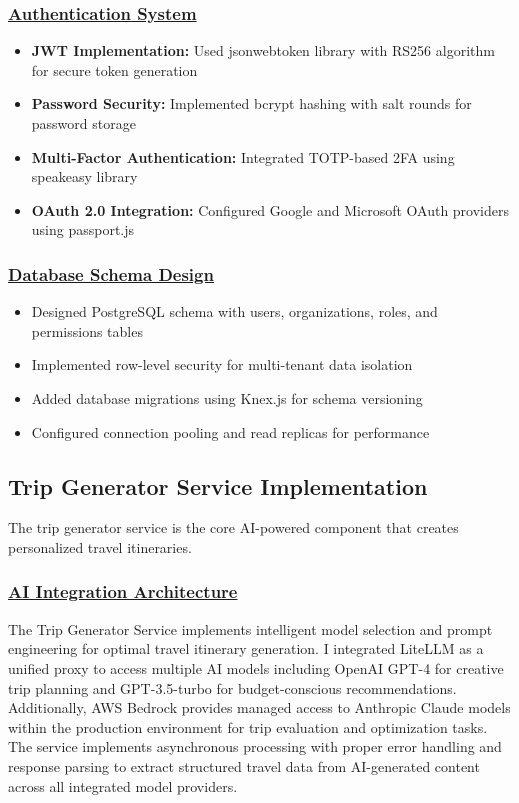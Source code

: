 \subsubsection*{\underline{Authentication System}}
\begin{itemize}
    \item \textbf{JWT Implementation:} Used jsonwebtoken library with RS256 algorithm for secure token generation
    \item \textbf{Password Security:} Implemented bcrypt hashing with salt rounds for password storage
    \item \textbf{Multi-Factor Authentication:} Integrated TOTP-based 2FA using speakeasy library
    \item \textbf{OAuth 2.0 Integration:} Configured Google and Microsoft OAuth providers using passport.js
\end{itemize}

\subsubsection*{\underline{Database Schema Design}}
\begin{itemize}
    \item Designed PostgreSQL schema with users, organizations, roles, and permissions tables
    \item Implemented row-level security for multi-tenant data isolation
    \item Added database migrations using Knex.js for schema versioning
    \item Configured connection pooling and read replicas for performance
\end{itemize}

\subsection{Trip Generator Service Implementation}
The trip generator service is the core AI-powered component that creates personalized travel itineraries.

\subsubsection*{\underline{AI Integration Architecture}}
The Trip Generator Service implements intelligent model selection and prompt engineering for optimal travel itinerary generation. I integrated LiteLLM as a unified proxy to access multiple AI models including OpenAI GPT-4 for creative trip planning and GPT-3.5-turbo for budget-conscious recommendations. Additionally, AWS Bedrock provides managed access to Anthropic Claude models within the production environment for trip evaluation and optimization tasks. The service implements asynchronous processing with proper error handling and response parsing to extract structured travel data from AI-generated content across all integrated model providers.

